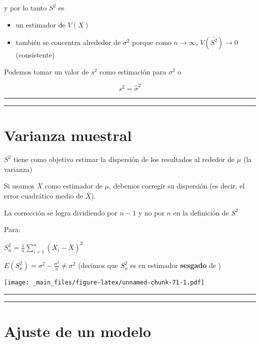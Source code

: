 \documentclass[
]{book}
\providecommand{\tightlist}{%
  \setlength{\itemsep}{0pt}\setlength{\parskip}{0pt}}
\begin{document}
y por lo tanto \(S^2\) es

\begin{itemize}
\tightlist
\item
  un estimador de \(V(X)\)
\item
  también se concentra alrededor de \(\sigma^2\) porque como \(n \rightarrow \infty\), \(V(\bar{S^2}) \rightarrow 0\) (consistente)
\end{itemize}

Podemos tomar un valor de \(s^2\) como estimación para \(\sigma^2\) o

\[s^2=\hat{\sigma}^2\]

\begin{center}\rule{0.5\linewidth}{0.5pt}\end{center}

\begin{center}\rule{0.5\linewidth}{0.5pt}\end{center}

\hypertarget{varianza-muestral-1}{%
\section{Varianza muestral}\label{varianza-muestral-1}}

\(S^2\) tiene como objetivo estimar la dispersión de los resultados al rededor de \(\mu\) (la varianza)

Si usamos \(\bar{X}\) como estimador de \(\mu\), debemos corregir su dispersión (es decir, el error cuadrático medio de \(\bar{X}\)).

La corrección se logra dividiendo por \(n-1\) y no por \(n\) en la definición de \(S^2\)

Para:

\(S_n^2=\frac{1}{n}\sum_{i=1}^n (X_i-\bar{X})^2\)

\(E(S_n^2) = \sigma^2-\frac{\sigma^2}{n} \neq \sigma^2\) (decimos que \(S_n^2\) es en estimador \textbf{sesgado} de \sigma)

\texttt{[image: \_main\_files/figure-latex/unnamed-chunk-71-1.pdf]}

\begin{center}\rule{0.5\linewidth}{0.5pt}\end{center}

\begin{center}\rule{0.5\linewidth}{0.5pt}\end{center}

\hypertarget{ajuste-de-un-modelo}{%
\section{Ajuste de un modelo}\label{ajuste-de-un-modelo}}
\end{document}
